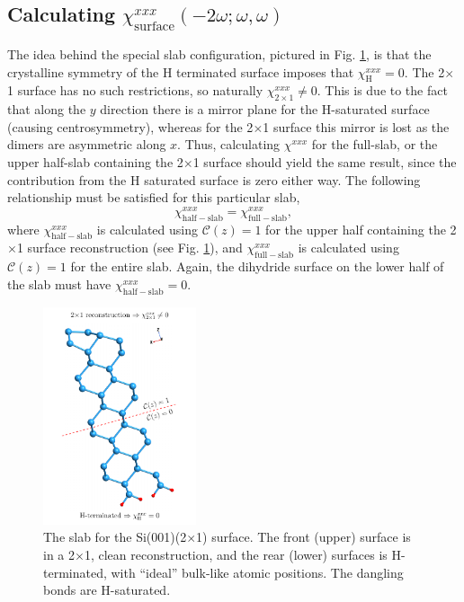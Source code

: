 
\subsection{Calculating 
\texorpdfstring{$\chi^{xxx}_{\mathrm{surface}}(-2\omega;\omega,\omega)$}{Xxxx}}
\label{sec:res2x1chi}

The idea behind the special slab configuration, pictured in Fig.
\ref{fig:si2x1slab}, is that the crystalline symmetry of the H terminated
surface imposes that $\chi_{\mathrm{H}}^{xxx}=0$. The 2$\times$1 surface has no
such restrictions, so naturally $\chi_{2\times 1}^{xxx}\ne 0$. This is due to
the fact that along the $y$ direction there is a mirror plane for the
H-saturated surface (causing centrosymmetry), whereas for the 2$\times$1 surface
this mirror is lost as the dimers are asymmetric along $x$. Thus, calculating
$\chi^{xxx}$ for the full-slab, or the upper half-slab containing the 2$\times$1
surface \cite{note1} should yield the same result, since the contribution from
the H saturated surface is zero either way. The following relationship must be
satisfied for this particular slab,
\begin{equation*}
\chi_{\mathrm{half-slab}}^{xxx} =
\chi_{\mathrm{full-slab}}^{xxx},
\end{equation*}
where $\chi_{\mathrm{half-slab}}^{xxx}$ is calculated using
${\mathbf{\mathcal{C}}}(z) = 1$ for the upper half containing the 2$\times$1
surface reconstruction (see Fig. \ref{fig:si2x1slab}), and
$\chi_{\mathrm{full-slab}}^{xxx}$ is calculated using ${\mathbf{\mathcal{C}}}(z)
= 1$ for the entire slab. Again, the dihydride surface on the lower half of the
slab must have $\chi_{\mathrm{half-slab}}^{xxx} = 0$.

\begin{figure}[h]
\centering 
\includegraphics[width=0.4\textwidth]{content/figures/struc-Si2x1-rot}
\caption[The slab for the Si(001)(2$\times$1) surface.]
{The slab for the Si(001)(2$\times$1) surface. The front (upper) surface
is in a 2$\times$1, clean reconstruction, and the rear (lower) surfaces is
H-terminated, with ``ideal'' bulk-like atomic positions. The dangling bonds are
H-saturated.}
\label{fig:si2x1slab}
\end{figure} 


